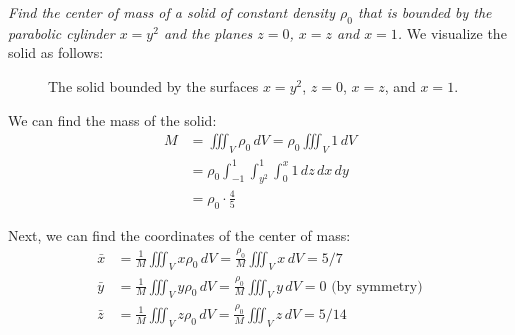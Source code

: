 \documentclass[11pt]{report}
\begin{document}
\begin{example}
    \textit{Find the center of mass of a solid of constant density $\rho_0$ that is bounded by the parabolic cylinder $x = y^2$ and the planes $z=0$, $x=z$ and $x=1$.}
    We visualize the solid as follows:
    \begin{figure}[h!]
        \centering
        \caption{The solid bounded by the surfaces $x = y^2$, $z = 0$, $x = z$, and $x = 1$.}
    \end{figure}
    We can find the mass of the solid:
    \begin{align*}
        M &= \iiint_V \rho_0 \, dV = \rho_0 \iiint_V 1 \, dV \\
        &= \rho_0 \int_{-1}^1 \int_{y^2}^1 \int_{0}^x 1 \, dz \, dx \, dy \\
        &= \rho_0 \cdot \frac{4}{5}
    \end{align*}

    Next, we can find the coordinates of the center of mass:
    \begin{align*}
        \bar{x} &= \frac{1}{M} \iiint_V x \rho_0 \, dV = \frac{\rho_0}{M} \iiint_V x \, dV = 5/7 \\
        \bar{y} &= \frac{1}{M} \iiint_V y \rho_0 \, dV = \frac{\rho_0}{M} \iiint_V y \, dV = 0 \text{ (by symmetry)} \\
        \bar{z} &= \frac{1}{M} \iiint_V z \rho_0 \, dV = \frac{\rho_0}{M} \iiint_V z \, dV = 5/14 \\
    \end{align*}    
\end{example}
\end{document}
